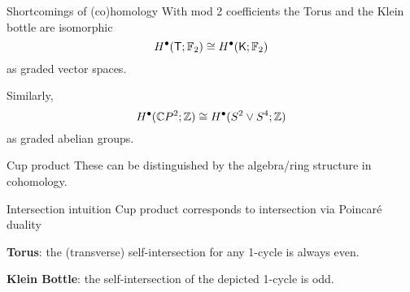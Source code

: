 \begin{frame}{Shortcomings of (co)homology}
	\pause With mod 2 coefficients the Torus and the Klein bottle are isomorphic
	\[
	H^\bullet(\mathsf T; {\mathbb{F}_2}) \cong H^\bullet(\mathsf K; {\mathbb{F}_2})
	\]
	as graded vector spaces.

	\bigskip \pause
	Similarly,
	\[
	H^\bullet(\mathbb{C} P^2; \mathbb{Z}) \cong H^\bullet(S^2 \vee S^4; \mathbb{Z})
	\]
	as graded abelian groups.

	\bigskip \pause
	\begin{block}{Cup product}
		These can be distinguished by the algebra/ring structure in cohomology.
	\end{block}
\end{frame}

\begin{frame}{Intersection intuition}
	\pause Cup product corresponds to intersection via Poincar\'e duality
	\pause
	\begin{figure}
		
		\label{f:torus and klein bottle}
	\end{figure}

	\textbf{Torus}: the (transverse) self-intersection for any 1-cycle is always \textcolor{pblue}{even}.

	\medskip

	\textbf{Klein Bottle}: the self-intersection of the depicted 1-cycle is \textcolor{pblue}{odd}.
\end{frame}